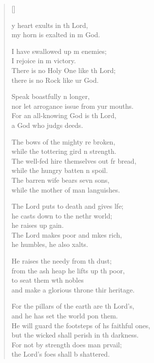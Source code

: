 \settowidth{\versewidth}{He will guard the footsteps of his faithful ones *}
\begin{verse}[\versewidth]
  \begin{patverse}
    y heart exults in th Lord,\Med\\
my horn is exalted in m God.

I have swallowed up m enemies;\Med\\
I rejoice in m victory.\\
There is no Holy One like th Lord;\Med\\
there is no Rock like ur God.

Speak boastfully n longer,\Med\\
nor let arrogance issue from yur mouths.\\
For an all-knowing God is th Lord,\Med\\
a God who judgs deeds.

The bows of the mighty re broken,\Med\\
while the tottering gird n strength.\\
The well-fed hire themselves out fr bread,\Med\\
while the hungry batten n spoil.\\
The barren wife bears sevn sons,\Med\\
while the mother of man languishes.

The Lord puts to death and gives l\pointup{\i}fe;\Flex\\
he casts down to the nethr world;\Med\\
he raises up gain.\\
The Lord makes poor and mkes rich,\Med\\
he humbles, he also xalts.

He raises the needy from th dust;\Med\\
from the ash heap he lifts up th poor,\\
to seat them w\pointup{\i}th nobles\Med\\
and make a glorious throne thir heritage.

For the pillars of the earth are th Lord’s,\Med\\
and he has set the world pon them.\\
He will guard the footsteps of h\pointup{\i}s faithful ones,\Med\\
but the wicked shall perish in th darkness.\\
For not by strength does man prvail;\Med\\
the Lord’s foes shall b shattered.


\end{patverse}
\end{verse}
